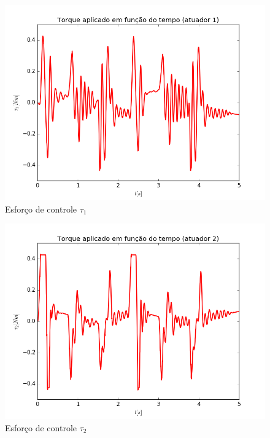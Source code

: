 \documentclass[]{politex}
\begin{document}
\begin{multicols}{2}
\begin{figure}[H]
	\centering
	\includegraphics[scale=0.39]{../../../Experimental/Aquisicoes/PIDSMCt_triangulo/tau1.png}  
	\caption{Esforço de controle $\tau_1$}
	\label{fig:PIDSMCq_triangulo_tau1}
\end{figure}
\begin{figure}[H]
	\centering
	\includegraphics[scale=0.39]{../../../Experimental/Aquisicoes/PIDSMCt_triangulo/tau2.png}  
	\caption{Esforço de controle $\tau_2$}
	\label{fig:PIDSMCq_triangulo_tau2}
\end{figure}
\end{multicols}
\end{document}
